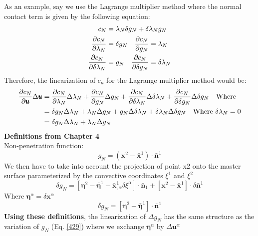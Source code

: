 \documentclass[12pt,3p]{article}
\numberwithin{equation}{section}
\begin{document}
As an example, say we use the Lagrange multiplier method where the normal contact term is given by the following equation: 
\begin{align}
\begin{split}
c_N &= \lambda_N \delta g_N + \delta \lambda_N g_N \\
\pdv{c_N}{\lambda_N} &= \delta g_N \quad \pdv{c_N}{g_N} = \lambda_N \\
\pdv{c_N}{\delta \lambda_N} &= g_N \quad \pdv{c_N}{\delta g_N} = \delta \lambda_N
\end{split}
\end{align}
Therefore, the linearization of $c_n$ for the Lagrange multiplier method would be: 
\begin{align}
\begin{split}
\pdv{c_N}{\pmb{u}} \Delta \pmb{u} &= \pdv{c_N}{\lambda_N} \Delta \lambda_N + \pdv{c_N}{g_N} \Delta g_N + \pdv{c_N}{\delta \lambda_N} \Delta \delta \lambda_N + \pdv{c_N}{\delta g_N} \Delta \delta g_N \quad \text{Where } \\
			&= \delta g_N \Delta \lambda_N + \lambda_N \Delta g_N + g_N \Delta \delta \lambda_N + \delta \lambda_N \Delta \delta g_N \quad \text{Where } \delta \lambda_N = 0 \\
			&= \delta g_N \Delta \lambda_N + \lambda_N \Delta g_N
\end{split}
\end{align}
\textbf{Definitions from Chapter 4} \\
Non-penetration function:
\begin{equation}\label{46}
g_N = (\mathbf{x}^2 - \mathbf{\bar{x}}^1) \cdot \bar{\mathbf{n}}^1
\end{equation}
We then have to take into account the projection of point x2 onto the master surface parameterized by the convective coordinates $\xi^1$ and $\xi^2$
\begin{equation}\label{428}
\delta g_N = [ \pmb{\eta}^2 - \pmb{\bar{\eta}}^1 - \mathbf{\bar{x}}^1_{,\alpha} \delta \xi^\alpha ] \cdot \mathbf{\bar{n}}_1 + [\mathbf{x}^2 - \mathbf{\bar{x}}^1] \cdot \delta \mathbf{\bar{n}}^1
\end{equation}
Where $\pmb{\eta}^\alpha = \delta \mathbf{x}^\alpha$
\begin{equation}\label{429}
\delta g_N = [\pmb{\eta}^2 - \pmb{\bar{\eta}}^1] \cdot \mathbf{\bar{n}}^1
\end{equation}
\textbf{Using these definitions}, the linearization of $\Delta g_N$ has the same structure as the variation of $g_N$ (Eq. \ref{429}) where we exchange $\pmb{\eta}^\alpha$ by $\Delta \mathbf{u}^\alpha$
\end{document}
